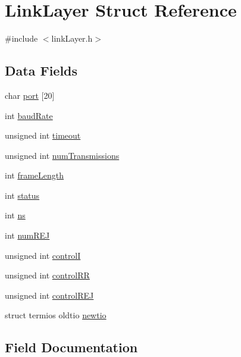\hypertarget{struct_link_layer}{}\section{Link\+Layer Struct Reference}
\label{struct_link_layer}


{\ttfamily \#include $<$link\+Layer.\+h$>$}

\subsection*{Data Fields}
\begin{DoxyCompactItemize}
\item 
char \hyperlink{struct_link_layer_a1bf41122fd2e6f904119473794d4f52b}{port} \mbox{[}20\mbox{]}
\item 
int \hyperlink{struct_link_layer_a352a05efbed742a2c47e738725ee5613}{baud\+Rate}
\item 
unsigned int \hyperlink{struct_link_layer_a25af7eefd48048fb067a60b8e295caf1}{timeout}
\item 
unsigned int \hyperlink{struct_link_layer_ac032302ea4696263706fe7dd32e6e4bc}{num\+Transmissions}
\item 
int \hyperlink{struct_link_layer_a54b1ba88e30a7c4c306510f916c82be4}{frame\+Length}
\item 
int \hyperlink{struct_link_layer_a6e27f49150e9a14580fb313cc2777e00}{status}
\item 
int \hyperlink{struct_link_layer_a8e83bd7735d1f2d707f5d341c8e61d1e}{ns}
\item 
int \hyperlink{struct_link_layer_aa4d6e890dc476e1b417da6dbce703010}{num\+R\+EJ}
\item 
unsigned int \hyperlink{struct_link_layer_ad135760367bb980137e6badc2542d34c}{controlI}
\item 
unsigned int \hyperlink{struct_link_layer_aac8a898c4324d9876321afb46fe34352}{control\+RR}
\item 
unsigned int \hyperlink{struct_link_layer_ac0edaea9dde71c9ad5539941eb600053}{control\+R\+EJ}
\item 
struct termios oldtio \hyperlink{struct_link_layer_abc97f5054a1b45039965e4ee787abc03}{newtio}
\end{DoxyCompactItemize}


\subsection{Field Documentation}
\hypertarget{struct_link_layer_a352a05efbed742a2c47e738725ee5613}{}\label{struct_link_layer_a352a05efbed742a2c47e738725ee5613} 
